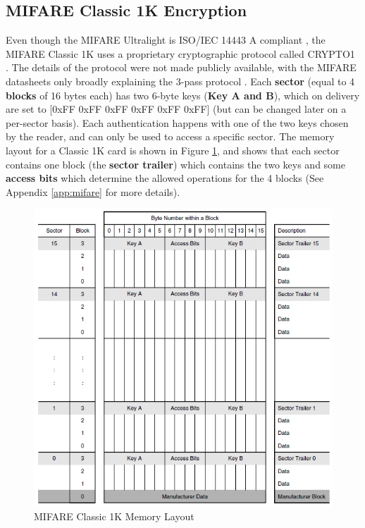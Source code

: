\documentclass[fleqn,10pt]{SelfArx} %
\begin{document}
\subsection{MIFARE Classic 1K Encryption}

Even though the MIFARE Ultralight is ISO/IEC 14443 A compliant \cite{ultralight}, the MIFARE Classic 1K uses a proprietary cryptographic protocol called CRYPTO1 \cite{classic1k}. The details of the protocol were not made publicly available, with the MIFARE datasheets only broadly explaining the 3-pass protocol \cite{classic1k}. Each {\bf sector} (equal to 4 {\bf blocks} of 16 bytes each) has two 6-byte keys ({\bf Key A and B}), which on delivery are set to [0xFF 0xFF 0xFF 0xFF 0xFF 0xFF] (but can be changed later on a per-sector basis). Each authentication happens with one of the two keys chosen by the reader, and can only be used to access a specific sector. The memory layout for a Classic 1K card is shown in Figure \ref{fig:memory}, and shows that each sector contains one block (the {\bf sector trailer}) which contains the two keys and some {\bf access bits} which determine the allowed operations for the 4 blocks (See Appendix \ref{app:mifare} for more details).

\begin{figure}[h]
  \includegraphics[width=\linewidth]{img/memory.png}
  \caption{MIFARE Classic 1K Memory Layout \cite{classic1k}}
  \label{fig:memory}
\end{figure}
\end{document}
